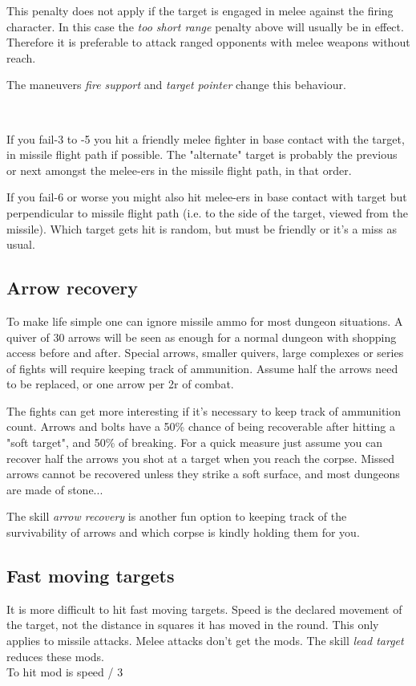 This penalty does not apply if the target is engaged in melee against the firing character. In this case the \emph{too short range} penalty above will usually be in effect. Therefore it is preferable to attack ranged opponents with melee weapons without reach.

The maneuvers \emph{fire support} and \emph{target pointer} change this behaviour.

\

If you fail-3 to -5 you hit a friendly melee fighter in base contact with the target, in missile flight path if possible. The "alternate" target is probably the previous or next amongst the melee-ers in the missile flight path, in that order.

If you fail-6 or worse you might also hit melee-ers in base contact with target but perpendicular to missile flight path (i.e. to the side of the target, viewed from the missile). Which target gets hit is random, but must be friendly or it's a miss as usual.


\subsection*{Arrow recovery}
To make life simple one can ignore missile ammo for most dungeon situations. A quiver of 30 arrows will be seen as enough for a normal dungeon with shopping access before and after. Special arrows, smaller quivers, large complexes or series of fights will require keeping track of ammunition. Assume half the arrows need to be replaced, or one arrow per 2r of combat.

The fights can get more interesting if it's necessary to keep track of ammunition count.
Arrows and bolts have a 50\% chance of being recoverable after hitting a "soft target", and 50\% of breaking. For a quick measure just assume you can recover half the arrows you shot at a target when you reach the corpse.
Missed arrows cannot be recovered unless they strike a soft surface, and most dungeons are made of stone...

The skill \emph{arrow recovery} is another fun option to keeping track of the survivability of arrows and which corpse is kindly holding them for you.


\subsection*{Fast moving targets}
It is more difficult to hit fast moving targets. Speed is the declared movement of the target, not the distance in squares it has moved in the round. This only applies to missile attacks. Melee attacks don't get the mods. The skill \emph{lead target} reduces these mods. \\
To hit mod is speed / 3

